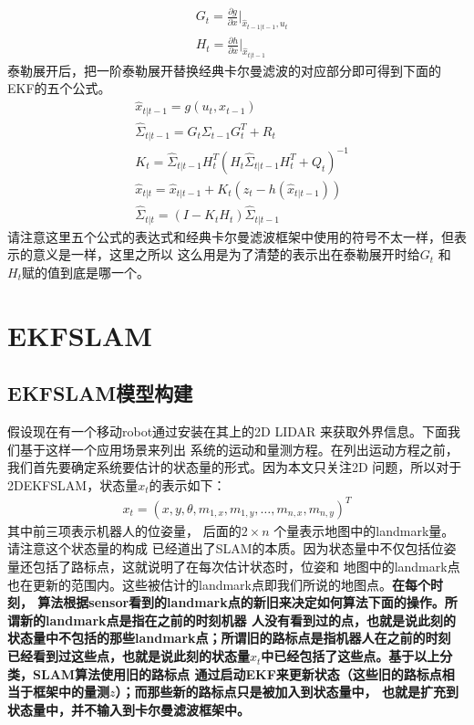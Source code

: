 \documentclass[UTF8,a4paper,10pt]{ctexart}
\begin{document}
\begin{align}
&G_t=\frac{\partial{g}}{\partial{x}}|_{\hat{x}_{t-1|t-1},u_t}\\
&H_t=\frac{\partial{h}}{\partial{x}}|_{\hat{x}_{t|t-1}}
\end{align}
泰勒展开后，把一阶泰勒展开替换经典卡尔曼滤波的对应部分即可得到下面的EKF的五个公式。
\begin{align}
& \hat{x}_{t|t-1}=g(u_t,x_{t-1})\\
& \hat{\Sigma}_{t|t-1}=G_t\Sigma_{t-1}G_t^T+R_t\\
& K_t=\hat{\Sigma}_{t|t-1}H_t^T(H_t\hat{\Sigma}_{t|t-1}H_t^T+Q_t)^{-1}\\
& \hat{x}_{t|t}=\hat{x}_{t|t-1}+K_t(z_t-h(\hat x_{t|{t-1}}))\\
& \hat{\Sigma}_{t|t}=(I-K_tH_t)\hat{\Sigma}_{t|t-1}
\end{align}
请注意这里五个公式的表达式和经典卡尔曼滤波框架中使用的符号不太一样，但表示的意义是一样，这里之所以
这么用是为了清楚的表示出在泰勒展开时给$G_t$ 和 $H_t$赋的值到底是哪一个。

\section{EKFSLAM}
\subsection{EKFSLAM模型构建}
\label{moxing}
假设现在有一个移动robot通过安装在其上的2D LIDAR 来获取外界信息。下面我们基于这样一个应用场景来列出
系统的运动和量测方程。在列出运动方程之前，我们首先要确定系统要估计的状态量的形式。因为本文只关注2D
问题，所以对于2DEKFSLAM，状态量$x_t$的表示如下：
\begin{align}
x_t=(x,y,\theta, m_{1,x}, m_{1,y},\dots, m_{n,x}, m_{n,y})^T
\end{align}
其中前三项表示机器人的位姿量， 后面的$2 \times n$ 个量表示地图中的landmark量。请注意这个状态量的构成
已经道出了SLAM的本质。因为状态量中不仅包括位姿量还包括了路标点，这就说明了在每次估计状态时，位姿和
地图中的landmark点也在更新的范围内。这些被估计的landmark点即我们所说的地图点。{\bfseries 在每个时刻，
算法根据sensor看到的landmark点的新旧来决定如何算法下面的操作。所谓新的landmark点是指在之前的时刻机器
人没有看到过的点，也就是说此刻的状态量中不包括的那些landmark点；所谓旧的路标点是指机器人在之前的时刻
已经看到过这些点，也就是说此刻的状态量$x_t$中已经包括了这些点。基于以上分类，SLAM算法使用旧的路标点
通过启动EKF来更新状态（这些旧的路标点相当于框架中的量测$z$）；而那些新的路标点只是被加入到状态量中，
也就是扩充到状态量中，并不输入到卡尔曼滤波框架中。} 
\end{document}

